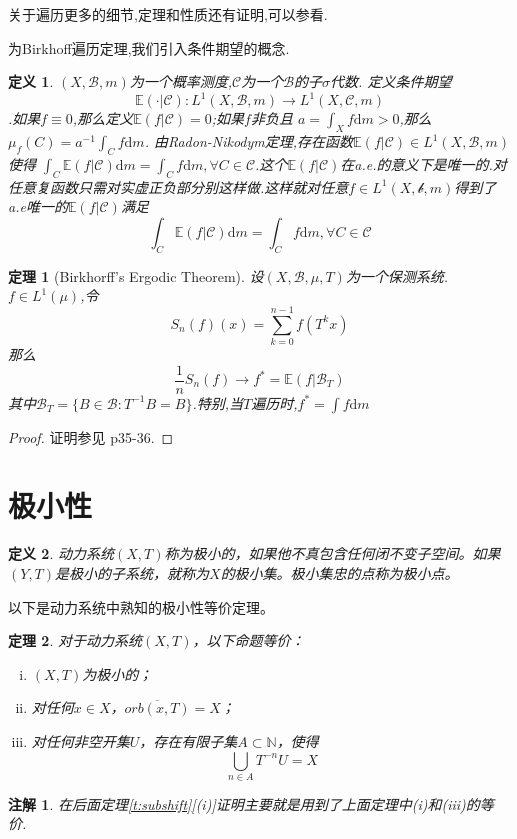\documentclass[a4paper,11pt,oneside]{book}
\newtheorem{theorem}{\textbf{\hspace{0.7cm}定理}}[section]
\newtheorem{definition}{\textbf{\hspace{0.7cm}定义}}[section]
\newtheorem{remark}{\textbf{\hspace{0.7cm}注解}}[section]
\newcommand{\ms}[1]{\mathscr{#1}}
\begin{document}
关于遍历更多的细节,定理和性质还有证明,可以参看\cite{pw}.

为Birkhoff遍历定理,我们引入条件期望的概念.
\begin{definition}
$(X,\ms{B},m)$为一个概率测度,$\ms C$为一个$\ms B$的子$\sigma$代数.
定义条件期望$$\mathbb{E}(\cdot|\ms{C}):L^1(X,\ms{B},m)\rightarrow L^1(X,\ms{C},m)$$.如果$f\equiv 0$,那么定义$\mathbb{E}(f|\ms{C})=0$;如果$f$非负且%
$a=\int_X f \mathrm d m>0$,那么$\mu_f(C)=a^{-1}\int_C f\mathrm d m$.
由Radon-Nikodym定理,存在函数$\mathbb{E}(f|\ms{C})\in L^1(X,\ms B,m)$使得%
$\int_C \mathbb{E}(f|\ms{C})\mathrm d m=\int_C f\mathrm d m,\forall C\in \ms C$.这个$\mathbb{E}(f|\ms{C})$在a.e.的意义下是唯一的.对任意复函数只需对实虚正负部分别这样做.这样就对任意$f\in L^1(X,\ms b,m)$得到了a.e唯一的$\mathbb{E}(f|\ms{C})$满足$$\int_C \mathbb{E}(f|\ms{C})\mathrm d m=\int_C f\mathrm d m,\forall C\in \ms C$$
\end{definition}

\begin{theorem}[Birkhorff's Ergodic Theorem]
设$(X,\ms B,\mu,T)$为一个保测系统.$f\in L^1(\mu)$,令$$S_n(f)(x)=\sum_{k=0}^{n-1}f(T^kx)$$那么$$\frac{1}{n}S_n(f)\rightarrow f^*=\mathbb{E}(f|\ms B_T)$$
其中$\ms B_T=\{B\in \ms B:T^{-1}B=B\}$.特别,当$T$遍历时,$f^*=\int f \mathrm d m$
\end{theorem}
\begin{proof}
证明参见\cite{hy} p35-36.
\end{proof}
\section{极小性}
\begin{definition}
动力系统$(X,T)$称为极小的，如果他不真包含任何闭不变子空间。如果$(Y,T)$是极小的子系统，就称为$X$的极小集。极小集忠的点称为极小点。
\end{definition}
以下是动力系统中熟知的极小性等价定理。
\begin{theorem}
\label{t:minimal}
对于动力系统$(X,T)$，以下命题等价：
\begin{enumerate}[(i)]
\item $(X,T)$为极小的；
\item 对任何$x\in X$，$\overline{orb(x,T)}=X$；
\item 对任何非空开集$U$，存在有限子集$A\subset \mathbb{N}$，使得$$\bigcup_{n\in A}T^{-n}U=X$$
\end{enumerate}
\end{theorem}
\begin{remark}
在后面定理\ref{t:subshift}[(i)]证明主要就是用到了上面定理中(i)和(iii)的等价.
\end{remark}
\end{document}
